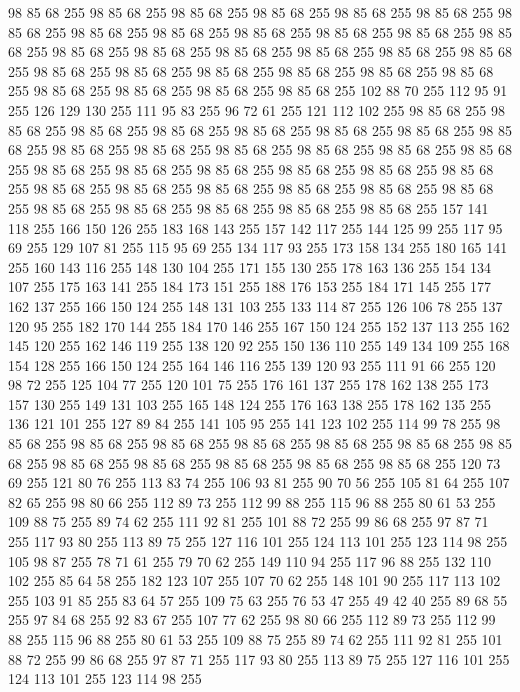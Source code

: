 98 85 68 255 98 85 68 255 98 85 68 255 98 85 68 255 98 85 68 255 98 85 68 255 98 85 68 255 98 85 68 255 98 85 68 255 98 85 68 255 98 85 68 255 98 85 68 255 98 85 68 255 98 85 68 255 98 85 68 255 98 85 68 255 98 85 68 255 98 85 68 255 98 85 68 255 98 85 68 255 98 85 68 255 98 85 68 255 98 85 68 255 98 85 68 255 98 85 68 255 98 85 68 255 98 85 68 255 98 85 68 255 98 85 68 255 102 88 70 255 112 95 91 255 126 129 130 255 111 95 83 255 96 72 61 255 121 112 102 255 98 85 68 255 98 85 68 255 98 85 68 255 98 85 68 255 98 85 68 255 98 85 68 255 98 85 68 255 98 85 68 255 98 85 68 255 98 85 68 255 98 85 68 255 98 85 68 255 98 85 68 255 98 85 68 255 98 85 68 255 98 85 68 255 98 85 68 255 98 85 68 255 98 85 68 255 98 85 68 255 98 85 68 255 98 85 68 255 98 85 68 255 98 85 68 255 98 85 68 255 98 85 68 255 98 85 68 255 98 85 68 255 98 85 68 255
98 85 68 255 98 85 68 255 157 141 118 255 166 150 126 255 183 168 143 255 157 142 117 255 144 125 99 255 117 95 69 255 129 107 81 255 115 95 69 255 134 117 93 255 173 158 134 255 180 165 141 255 160 143 116 255 148 130 104 255 171 155 130 255 178 163 136 255 154 134 107 255 175 163 141 255 184 173 151 255 188 176 153 255 184 171 145 255 177 162 137 255 166 150 124 255 148 131 103 255 133 114 87 255 126 106 78 255 137 120 95 255 182 170 144 255 184 170 146 255 167 150 124 255 152 137 113 255 162 145 120 255 162 146 119 255 138 120 92 255 150 136 110 255 149 134 109 255 168 154 128 255 166 150 124 255 164 146 116 255 139 120 93 255 111 91 66 255 120 98 72 255 125 104 77 255 120 101 75 255 176 161 137 255 178 162 138 255 173 157 130 255 149 131 103 255 165 148 124 255 176 163 138 255 178 162 135 255 136 121 101 255 127 89 84 255 141 105 95 255 141 123 102 255 114 99 78 255 98 85 68 255 98 85 68 255 98 85 68 255 98 85 68 255 98 85 68 255 98 85 68 255 98 85 68 255
98 85 68 255 98 85 68 255 98 85 68 255 98 85 68 255 98 85 68 255 120 73 69 255 121 80 76 255 113 83 74 255 106 93 81 255 90 70 56 255 105 81 64 255 107 82 65 255 98 80 66 255 112 89 73 255 112 99 88 255 115 96 88 255 80 61 53 255 109 88 75 255 89 74 62 255 111 92 81 255 101 88 72 255 99 86 68 255 97 87 71 255 117 93 80 255 113 89 75 255 127 116 101 255 124 113 101 255 123 114 98 255 105 98 87 255 78 71 61 255 79 70 62 255 149 110 94 255 117 96 88 255 132 110 102 255 85 64 58 255 182 123 107 255 107 70 62 255 148 101 90 255 117 113 102 255 103 91 85 255 83 64 57 255 109 75 63 255 76 53 47 255 49 42 40 255 89 68 55 255 97 84 68 255 92 83 67 255 107 77 62 255 98 80 66 255 112 89 73 255 112 99 88 255 115 96 88 255 80 61 53 255 109 88 75 255 89 74 62 255 111 92 81 255 101 88 72 255 99 86 68 255 97 87 71 255 117 93 80 255 113 89 75 255 127 116 101 255 124 113 101 255 123 114 98 255
